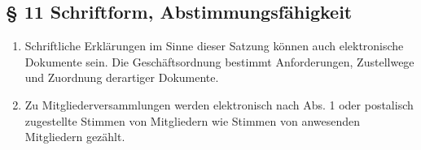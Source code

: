 ﻿\documentclass[10pt,a4paper]{scrartcl}
\begin{document}
\subsection*{§ 11 Schriftform, Abstimmungsfähigkeit}
\begin{enumerate}
        \item Schriftliche Erklärungen im Sinne dieser Satzung können auch
                elektronische Dokumente sein. Die Geschäftsordnung bestimmt
                Anforderungen, Zustellwege und Zuordnung derartiger Dokumente.
        \item Zu Mitgliederversammlungen werden elektronisch nach Abs. 1 oder
                postalisch zugestellte Stimmen von Mitgliedern wie Stimmen
                von anwesenden Mitgliedern gezählt.
\end{enumerate}
\end{document}
